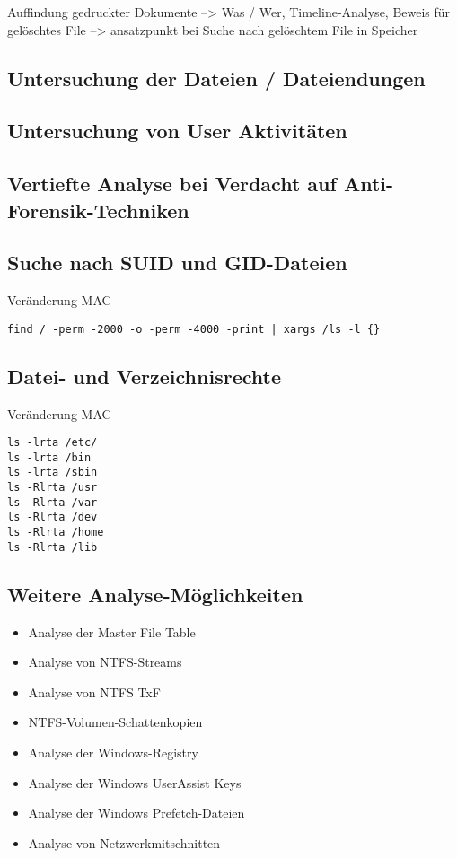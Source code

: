 Auffindung gedruckter Dokumente --> Was / Wer, Timeline-Analyse, Beweis für gelöschtes File --> ansatzpunkt bei Suche nach gelöschtem File in Speicher

\subsection{Untersuchung der Dateien / Dateiendungen}

\subsection{Untersuchung von User Aktivitäten}

\subsection{Vertiefte Analyse bei Verdacht auf Anti-Forensik-Techniken}

\subsection{Suche nach SUID und GID-Dateien}
Veränderung MAC
\begin{verbatim}
find / -perm -2000 -o -perm -4000 -print | xargs /ls -l {}
\end{verbatim}

\subsection{Datei- und Verzeichnisrechte}
Veränderung MAC
\begin{verbatim}
ls -lrta /etc/
ls -lrta /bin
ls -lrta /sbin
ls -Rlrta /usr
ls -Rlrta /var
ls -Rlrta /dev
ls -Rlrta /home
ls -Rlrta /lib
\end{verbatim}

\subsection{Weitere Analyse-Möglichkeiten}
\begin{itemize}
\item Analyse der Master File Table
\item Analyse von NTFS-Streams
\item Analyse von NTFS TxF
\item NTFS-Volumen-Schattenkopien
\item Analyse der Windows-Registry
\item Analyse der Windows UserAssist Keys
\item Analyse der Windows Prefetch-Dateien
\item Analyse von Netzwerkmitschnitten
\end{itemize}

